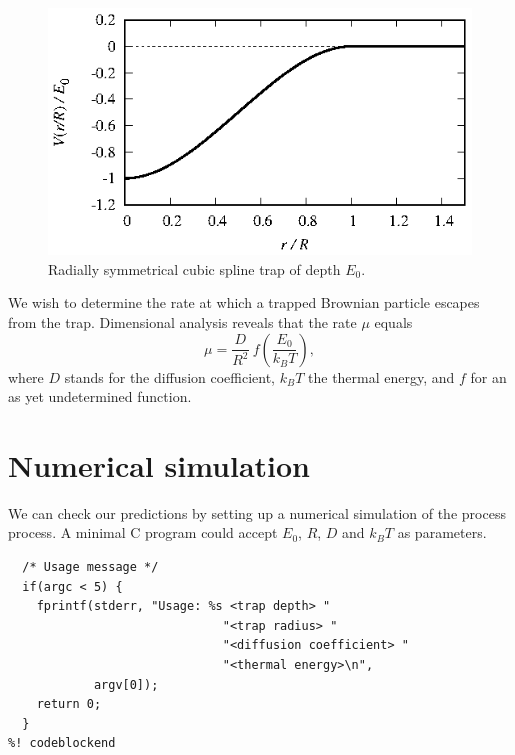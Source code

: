\documentclass{article}
\begin{document}
\begin{figure}
  \centering
  \includegraphics[width=\linewidth]{cubic_spline.eps}
  \caption{\label{cubic_spline}Radially symmetrical cubic spline trap of depth
           $E_0$.}
\end{figure}

We wish to determine the rate at which a trapped Brownian particle escapes from
the trap. Dimensional analysis reveals that the rate $\mu$ equals
\begin{equation}
\label{dimensional_analysis}
  \mu = \frac{D}{R^2}\ f\left(\frac{E_0}{k_BT}\right),
\end{equation}
where $D$ stands for the diffusion coefficient, $k_BT$ the thermal energy, and
$f$ for an as yet undetermined function.

\section{Numerical simulation}

We can check our predictions by setting up a numerical simulation of the process
process. A minimal C program could accept $E_0$, $R$, $D$ and $k_BT$ as
parameters.

\begin{lstlisting}[frame=single]
%! codeblock: usage_message
  /* Usage message */
  if(argc < 5) {
    fprintf(stderr, "Usage: %s <trap depth> "
                              "<trap radius> "
                              "<diffusion coefficient> "
                              "<thermal energy>\n",
            argv[0]);
    return 0;
  }
%! codeblockend
\end{lstlisting}

\end{document}
